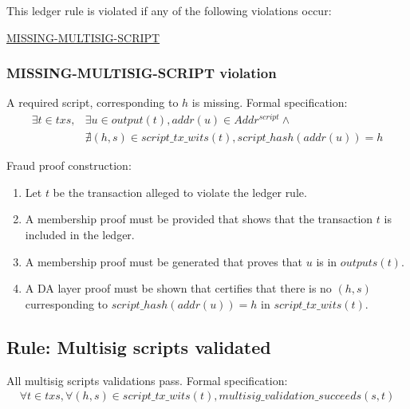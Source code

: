 \documentclass[../midgard.tex]{subfiles}
\begin{document}
This ledger rule is violated if any of the following violations occur:
\begin{itemize-multi}
  \item \hyperref[violation:MISSING-MULTISIG-SCRIPT]{MISSING-MULTISIG-SCRIPT}
\end{itemize-multi}

\subsubsection{MISSING-MULTISIG-SCRIPT violation}
\label{violation:MISSING-MULTISIG-SCRIPT}
A required script, corresponding to $h$ is missing.
Formal specification:
\begin{equation*}
\begin{split}
  \exists t \in txs, & \exists u \in output(t), addr(u) \in Addr^{script} \land \\
  & \nexists (h, s) \in script\_tx\_wits(t), script\_hash(addr(u)) = h
\end{split}
\end{equation*}

Fraud proof construction:
\begin{enumerate}
  \item Let $t$ be the transaction alleged to violate the ledger rule. 
  \item A membership proof must be provided that shows that the transaction $t$ is included in the ledger.
  \item A membership proof must be generated that proves that $u$ is in $outputs(t)$.
  \item A DA layer proof must be shown that certifies that there is no $(h, s)$ curresponding to \break
        $script\_hash(addr(u)) = h$ in $script\_tx\_wits(t)$.
\end{enumerate}

\subsection{Rule: Multisig scripts validated}
\label{rule:multisig-scripts-validated}

All multisig scripts validations pass.
Formal specification:
\begin{equation*}
\begin{split}
  \forall t \in txs, \forall (h, s) \in script\_tx\_wits(t), multisig\_validation\_succeeds(s, t)
\end{split}
\end{equation*}
\end{document}

